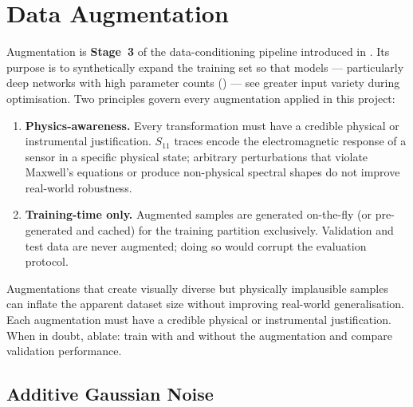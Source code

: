 
\section{Data Augmentation}
\label{sec:augment}

Augmentation is \textbf{Stage~3} of the data-conditioning pipeline
introduced in .  Its purpose is to synthetically
expand the training set so that models — particularly deep networks
with high parameter counts () — see greater input
variety during optimisation.  Two principles govern every augmentation
applied in this project:

\begin{enumerate}
  \item \textbf{Physics-awareness.}  Every transformation must have a
        credible physical or instrumental justification.
        $S_{11}$ traces encode the electromagnetic response of a sensor
        in a specific physical state; arbitrary perturbations that
        violate Maxwell's equations or produce non-physical spectral
        shapes do not improve real-world robustness.
  \item \textbf{Training-time only.}  Augmented samples are generated
        on-the-fly (or pre-generated and cached) for the training
        partition exclusively.  Validation and test data are never
        augmented; doing so would corrupt the evaluation protocol.
\end{enumerate}

\begin{tcolorbox}[
  colback=orange!5!white,
  colframe=orange!75!black,
  title={\textbf{Warning — Plausibility vs.\ Diversity}},
  fonttitle=\bfseries
]
Augmentations that create visually diverse but physically implausible
samples can inflate the apparent dataset size without improving
real-world generalisation.  Each augmentation must have a credible
physical or instrumental justification.  When in doubt, ablate: train
with and without the augmentation and compare validation performance.
\end{tcolorbox}

\subsection{Additive Gaussian Noise}
\label{sec:augment:noise}

